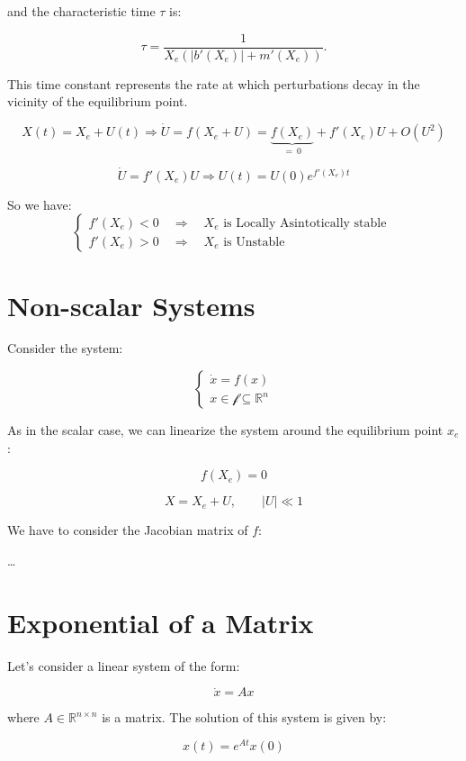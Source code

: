 and the characteristic time $\tau$ is:

$$
\tau = \frac{1}{X_e \left(|b'(X_e)| + m'(X_e)\right)}.
$$

This time constant represents the rate at which perturbations decay in the vicinity of the equilibrium point.


\newpage

$$
X(t) = X_e + U(t) \Rightarrow \dot U = f(X_e + U) = \underbrace{f(X_e)}_{=\ 0} + f'(X_e)U + O(U^2)
$$

$$
\dot U = f'(X_e)U \Rightarrow U(t) = U(0) e^{f'(X_e)t}
$$

So we have:
$$
\begin{cases}
f'(X_e) < 0 \quad \Rightarrow \quad X_e \text{ is Locally Asintotically stable } \\
f'(X_e) > 0 \quad \Rightarrow \quad X_e \text{ is Unstable }
\end{cases}
$$

\vspace{2em}

\section{Non-scalar Systems}

Consider the system:

$$
\begin{cases}
    \dot x = f(x) \\
    x \in \mathcal{f} \subseteq \mathbb{R}^n
\end{cases}
$$

As in the scalar case, we can linearize the system around the equilibrium point $x_e$:

$$
f(X_e) = 0
$$

$$
X = X_e + U, \quad \quad |U| \ll 1
$$

We have to consider the Jacobian matrix of $f$:

\dots

\newpage

\section{Exponential of a Matrix}

Let's consider a linear system of the form:

$$
\dot x = Ax
$$

where $A \in \mathbb{R}^{n \times n}$ is a matrix. The solution of this system is given by:

$$
x(t) = e^{At} x(0)
$$

